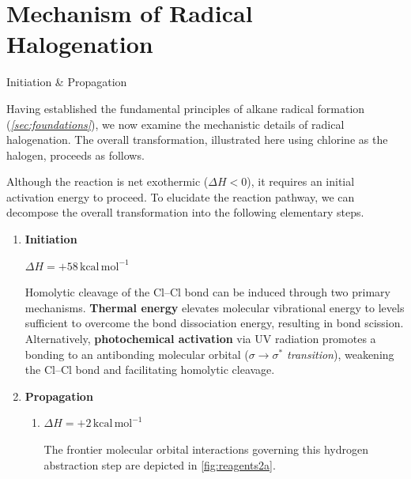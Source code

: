 \documentclass[10pt]{article}
\begin{document}
\section{Mechanism of Radical Halogenation}

  \begin{core}{Initiation \& Propagation}

    Having established the fundamental principles of alkane radical formation (\textit{\autoref{sec:foundations}}), we now examine the mechanistic details of radical halogenation. The overall transformation, illustrated here using chlorine as the halogen, proceeds as follows.


    Although the reaction is net exothermic ($\Delta H < 0$), it requires an initial activation energy to proceed. To elucidate the reaction pathway, we can decompose the overall transformation into the following elementary steps.

    \begin{enumerate}[label=(\arabic*)]

      \item \textbf{Initiation}
      
      \hspace{5mm}$\Delta H = +58\,\text{kcal}\,\text{mol}^{-1}$

      Homolytic cleavage of the Cl--Cl bond can be induced through two primary mechanisms. \textbf{Thermal energy} elevates molecular vibrational energy to levels sufficient to overcome the bond dissociation energy, resulting in bond scission. Alternatively, \textbf{photochemical activation} via UV radiation promotes a bonding  to an antibonding molecular orbital (\textit{$\sigma \to \sigma^*$ transition}), weakening the Cl--Cl bond and facilitating homolytic cleavage.

      \item \textbf{Propagation}

        \begin{enumerate}

          \item {}\hspace{5mm}$\Delta H = +2\,\text{kcal}\,\text{mol}^{-1}$

          The frontier molecular orbital interactions governing this hydrogen abstraction step are depicted in \autoref{fig:reagents2a}.


\end{enumerate}
\end{enumerate}
\end{core}
\end{document}
